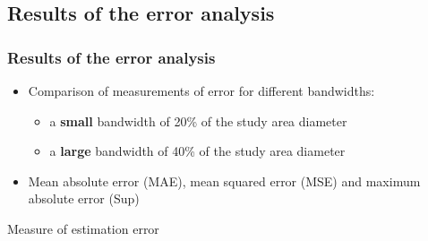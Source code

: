 \documentclass[notheorems]{beamer}
\theoremstyle{definition}
\theoremstyle{example}
\begin{document}
\subsection{Results of the error analysis}
\begin{frame}\frametitle{Results of the error analysis}
    \begin{itemize}
        \item Comparison of measurements of error for different bandwidths:
        \begin{itemize}
            \item a \textbf{small} bandwidth of 20\% of the study area diameter
            \item a \textbf{large} bandwidth of 40\% of the study area diameter
        \end{itemize}
        \item Mean absolute error (MAE), mean squared error (MSE) and maximum absolute error (Sup)
    \end{itemize}
    \begin{table}{Measure of estimation error}
        \centering
    \end{table}
\end{frame}

\end{document}
